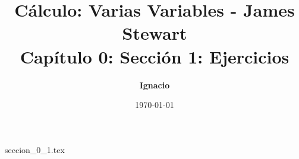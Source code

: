 \documentclass[11pt,spanish,oneside]{report}
\title{\textbf{Cálculo: Varias Variables - James Stewart} \\ \Large Capítulo 0: Sección 1: Ejercicios}
\author{\textbf{Ignacio}}
\date{\today}
\begin{document}
\maketitle

{seccion_0_1.tex}
\end{document}
